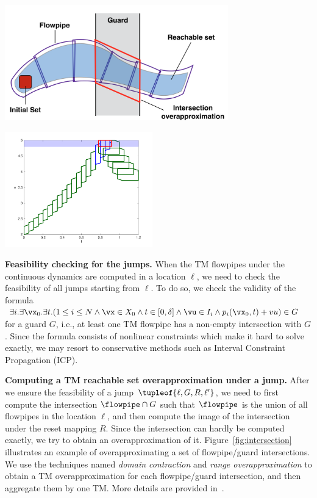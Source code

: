 \begin{minipage}{0.53\textwidth}
 \centering
 \includegraphics[height=5cm]{images/reachability.png}
 \label{fig:intersection}
\end{minipage}
\hspace{1ex}
\begin{minipage}{0.43\textwidth}
 \centering
 \includegraphics[height=5cm]{images/example_2D.png}
 \label{fig:example_2D}
\end{minipage}


\noindent\textbf{Feasibility checking for the jumps.}
When the TM flowpipes under the continuous dynamics are computed in a location $\ell$, we need to check the feasibility of all jumps starting from $\ell$. To do so, we check the validity of the formula $\exists i.\exists \vx_0.\exists t.(1\leq i\leq N \wedge \vx\in X_0 \wedge t\in [0,\delta] \wedge \vu\in I_i \wedge p_i(\vx_0,t) + vu) \in G$ for a guard $G$, i.e., at least one TM flowpipe has a non-empty intersection with $G$. Since the formula consists of nonlinear constraints which make it hard to solve exactly, we may resort to conservative methods such as Interval Constraint Propagation (ICP).




\noindent\textbf{Computing a TM reachable set overapproximation under a jump.}
After we ensure the feasibility of a jump $\tupleof{\ell, G, R, \ell'}$, we need to first compute the intersection $\flowpipe \cap G$ such that $\flowpipe$ is the union of all flowpipes in the location $\ell$, and then compute the image of the intersection under the reset mapping $R$. Since the intersection can hardly be computed exactly, we try to obtain an overapproximation of it. Figure~\ref{fig:intersection} illustrates an example of overapproximating a set of flowpipe/guard intersections. We use the techniques named \emph{domain contraction} and \emph{range overapproximation} to obtain a TM overapproximation for each flowpipe/guard intersection, and then aggregate them by one TM. More details are provided in~\cite{Chen+/2012/taylor_models,Chen/2015/phd}.


